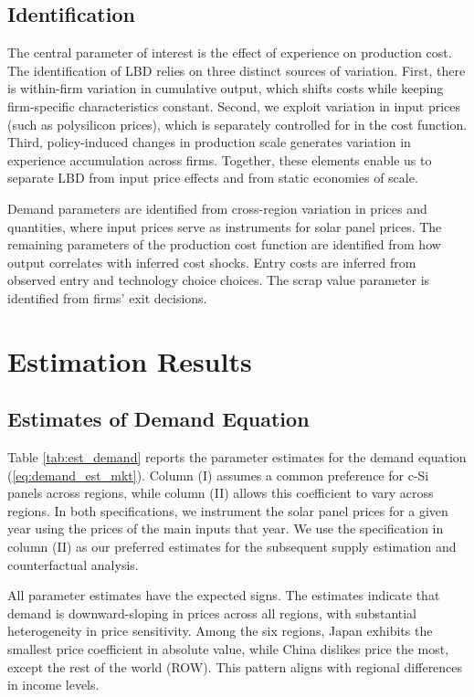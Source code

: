 \documentclass[12pt]{article}
\begin{document}
\subsection{Identification}
The central parameter of interest is the effect of experience on production cost. The identification of LBD relies on three distinct sources of variation. First, there is within-firm variation in cumulative output, which shifts costs while keeping firm-specific characteristics constant. Second, we exploit variation in input prices (such as polysilicon prices), which is separately controlled for in the cost function. Third, policy-induced changes in production scale  generates variation in experience accumulation across firms. Together, these elements enable us to separate LBD from input price effects and from static economies of scale.

Demand parameters are identified from cross-region variation in prices and quantities, where input prices serve as instruments for solar panel prices. 
The remaining parameters of the production cost function are identified from how output correlates with inferred cost shocks. Entry costs are inferred from observed entry and technology choice choices. The scrap value parameter is identified from firms' exit decisions.


\section{Estimation Results}
\label{sec:est_results}\label{sec:LBDresults}

\subsection{Estimates of Demand Equation}
\label{subsec:est_results_demand}

Table \ref{tab:est_demand} reports the parameter estimates for the demand equation (\ref{eq:demand_est_mkt}). Column (I) assumes a common preference for c-Si panels across regions, while column (II) allows this coefficient to vary across regions. In both specifications, we instrument the solar panel prices for a given year using the prices of the main inputs that year. We use the specification in column (II) as our preferred estimates for the subsequent supply estimation and counterfactual analysis.

All parameter estimates have the expected signs. The estimates indicate that demand is downward-sloping in prices across all regions, with substantial heterogeneity in price sensitivity. Among the six regions, Japan exhibits the smallest price coefficient in absolute value, while China dislikes price the most, except the rest of the world (ROW). This pattern aligns with regional differences in income levels.
\end{document}
